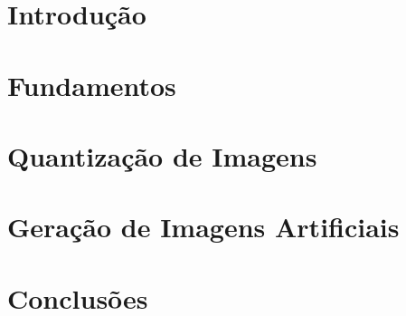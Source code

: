 \documentclass[mestrado, pre-defesa, english, brazil]{packages/icmc}
\begin{document}
\textual

\setcounter{page}{1}

\chapter{Introdução}
\label{cap:introducao}


\chapter{Fundamentos}
\label{cap:revisao}


\chapter{Quantização de Imagens}
\label{cap:quantization}


\chapter{Geração de Imagens Artificiais}
\label{cap:geracao-artificial}


\chapter{Conclusões}
\label{cap:conclusoes}


%

\postextual


\setcounter{page}{91}

%
% 
\end{document}
